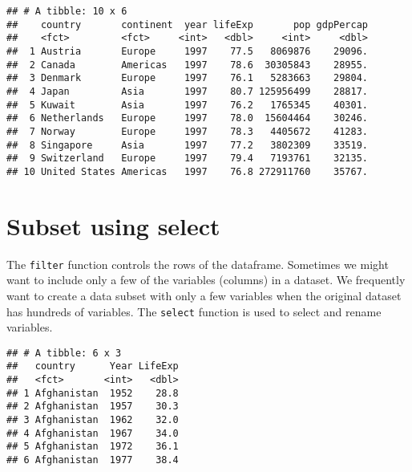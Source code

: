 \documentclass[]{book}
\newenvironment{Shaded}{\begin{snugshade}}{\end{snugshade}}
\newcommand{\KeywordTok}[1]{\textcolor[rgb]{0.13,0.29,0.53}{\textbf{#1}}}
\newcommand{\DataTypeTok}[1]{\textcolor[rgb]{0.13,0.29,0.53}{#1}}
\newcommand{\StringTok}[1]{\textcolor[rgb]{0.31,0.60,0.02}{#1}}
\newcommand{\CommentTok}[1]{\textcolor[rgb]{0.56,0.35,0.01}{\textit{#1}}}
\newcommand{\OperatorTok}[1]{\textcolor[rgb]{0.81,0.36,0.00}{\textbf{#1}}}
\newcommand{\NormalTok}[1]{#1}
\begin{document}
\begin{verbatim}
## # A tibble: 10 x 6
##    country       continent  year lifeExp       pop gdpPercap
##    <fct>         <fct>     <int>   <dbl>     <int>     <dbl>
##  1 Austria       Europe     1997    77.5   8069876    29096.
##  2 Canada        Americas   1997    78.6  30305843    28955.
##  3 Denmark       Europe     1997    76.1   5283663    29804.
##  4 Japan         Asia       1997    80.7 125956499    28817.
##  5 Kuwait        Asia       1997    76.2   1765345    40301.
##  6 Netherlands   Europe     1997    78.0  15604464    30246.
##  7 Norway        Europe     1997    78.3   4405672    41283.
##  8 Singapore     Asia       1997    77.2   3802309    33519.
##  9 Switzerland   Europe     1997    79.4   7193761    32135.
## 10 United States Americas   1997    76.8 272911760    35767.
\end{verbatim}

\section{Subset using select}\label{subset-using-select}

The \texttt{filter} function controls the rows of the dataframe.
Sometimes we might want to include only a few of the variables (columns)
in a dataset. We frequently want to create a data subset with only a few
variables when the original dataset has hundreds of variables. The
\texttt{select} function is used to select and rename variables.

\begin{Shaded}
\end{Shaded}

\begin{verbatim}
## # A tibble: 6 x 3
##   country      Year LifeExp
##   <fct>       <int>   <dbl>
## 1 Afghanistan  1952    28.8
## 2 Afghanistan  1957    30.3
## 3 Afghanistan  1962    32.0
## 4 Afghanistan  1967    34.0
## 5 Afghanistan  1972    36.1
## 6 Afghanistan  1977    38.4
\end{verbatim}
\end{document}
